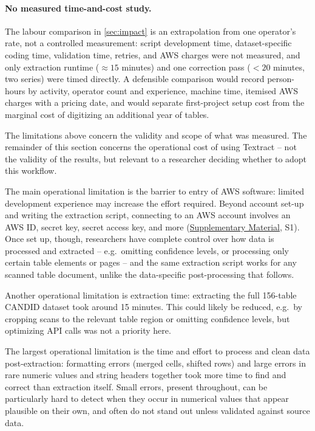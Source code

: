 \documentclass[12pt]{article}
\begin{document}
\paragraph{No measured time-and-cost study.} The labour comparison in \cref{sec:impact} is an extrapolation from one operator's rate, not a controlled measurement: script development time, dataset-specific coding time, validation time, retries, and AWS charges were not measured, and only extraction runtime ($\approx15$ minutes) and one correction pass ($<20$ minutes, two series) were timed directly. A defensible comparison would record person-hours by activity, operator count and experience, machine time, itemised AWS charges with a pricing date, and would separate first-project setup cost from the marginal cost of digitizing an additional year of tables.

\bigskip
\noindent The limitations above concern the validity and scope of what was measured. The remainder of this section concerns the operational cost of using Textract -- not the validity of the results, but relevant to a researcher deciding whether to adopt this workflow.

The main operational limitation is the barrier to entry of AWS software: limited development experience may increase the effort required. Beyond account set-up and writing the extraction script, connecting to an AWS account involves an AWS ID, secret key, secret access key, and more (\hyperref[sec:supp]{Supplementary Material}, S1). Once set up, though, researchers have complete control over how data is processed and extracted -- e.g.\ omitting confidence levels, or processing only certain table elements or pages -- and the same extraction script works for any scanned table document, unlike the data-specific post-processing that follows.

Another operational limitation is extraction time: extracting the full 156-table CANDID dataset took around 15 minutes. This could likely be reduced, e.g.\ by cropping scans to the relevant table region or omitting confidence levels, but optimizing API calls was not a priority here.

The largest operational limitation is the time and effort to process and clean data post-extraction: formatting errors (merged cells, shifted rows) and large errors in rare numeric values and string headers together took more time to find and correct than extraction itself. Small errors, present throughout, can be particularly hard to detect when they occur in numerical values that appear plausible on their own, and often do not stand out unless validated against source data.
\end{document}
